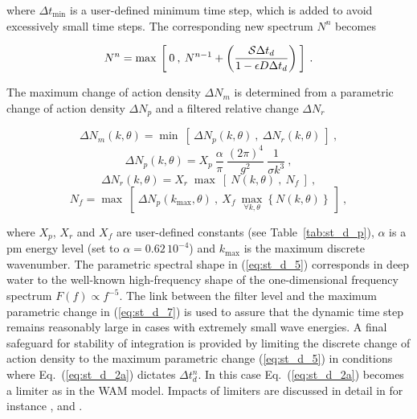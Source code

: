 \noindent
where $\Delta t_{\min}$ is a user-defined minimum time step, which is added to
avoid excessively small time steps. The corresponding new spectrum $N^n$
becomes

\begin{equation}
N^n = \max\: \left [ \: 0 \: , \: N^{n-1} + 
\left ( \frac{{\cal S} \Delta t_d}{1 - \epsilon D \Delta t_d} \right )
\: \right ] \: . \label{eq:st_d_3}
\end{equation}

\noindent 
The maximum change of action density $\Delta N_m$ is determined from a
parametric change of action density $\Delta N_p$ and a filtered relative
change $\Delta N_r$


\begin{equation}
\Delta N_m (k,\theta) = \min \: \left [ \:
\Delta N_p (k,\theta) \: , \: \Delta N_r (k,\theta) 
\: \right ] \: , \label{eq:st_d_4}
\end{equation} \begin{equation}
\Delta N_p (k,\theta) = X_p \: \frac{\alpha}{\pi} \:
\frac{(2\pi)^4}{g^2} \: \frac{1}{\sigma k^3}
\: , \label{eq:st_d_5}
\end{equation} \begin{equation}
\Delta N_r (k,\theta) = X_r \; \max \: \left [ \: 
N(k,\theta) \: , \: N_f \: \right ] \: , \label{eq:st_d_6}
\end{equation} \begin{equation}
N_f = \max \: \left [ \: \Delta N_p (k_{\max},\theta) \: , 
\: X_f \: \max_{\forall k,\theta} \left \{ N(k,\theta) \right \}
\: \right ] \: , \label{eq:st_d_7} \end{equation}

\noindent 
where $X_p$, $X_r$ and $X_f$ are user-defined constants (see
Table~\ref{tab:st_d_p}), $\alpha$ is a {\sc pm} energy level (set to $\alpha =
0.62\,10^{-4}$) and $k_{\max}$ is the maximum discrete wavenumber. The
parametric spectral shape in (\ref{eq:st_d_5}) corresponds in deep water to
the well-known high-frequency shape of the one-dimensional frequency spectrum
$F(f) \propto f^{-5}$. The link between the filter level and the maximum
parametric change in (\ref{eq:st_d_7}) is used to assure that the dynamic time
step remains reasonably large in cases with extremely small wave energies. A
final safeguard for stability of integration is provided by limiting the
discrete change of action density to the maximum parametric change
(\ref{eq:st_d_5}) in conditions where Eq.~(\ref{eq:st_d_2a}) dictates $\Delta
t_d^n$. In this case Eq.~(\ref{eq:st_d_2a}) becomes a limiter as in the WAM
model. Impacts of limiters are discussed in detail in for instance
\cite{art:HJ99,art:HJ01}, \cite{art:HA01} and \cite{tol:GAOS02}.

